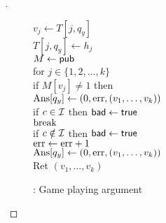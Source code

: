 \begin{proof}[]
\begin{figure}
{{\nudge \nudge $v_j \gets T[j,q_y]$\\
\nudge $T[j,q_y] \gets h_j$\\
%
$M \gets{\sf pub}$\\
for $j \in \{1,2,\ldots,k\}$\\
\nudge if $M[v_j] \neq 1$ then \\
\nudge \nudge $\mathrm{Ans}[q_y] \gets (0,\mathrm{err}, (v_1, \ldots, v_{k}) )$\\
\nudge \nudge if $c \in {\cal I}$ then $\mathsf{bad} \gets \mathsf{true}$\\
\nudge \nudge $\mathrm{break}$\\
if $c \notin {\cal I}$ then $\mathsf{bad} \gets \mathsf{true}$\\
$\mathrm{err} \gets \mathrm{err} +1$\\
$\mathrm{Ans}[q_y] \gets (0,\mathrm{err}, (v_1, \ldots, v_{k}))$\\
Ret $\left(v_1,\ldots,v_k\right)$
}
}
\caption{: Game playing argument}\label{fig:3TGame}
\end{figure}

%

\end{proof}
